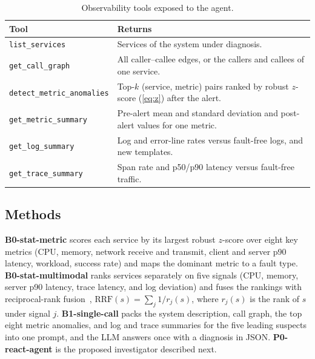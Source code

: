 \documentclass[conference]{IEEEtran}
\begin{document}
\begin{table}[t]
\centering
\caption{Observability tools exposed to the agent.}
\label{tab:tools}
\footnotesize
\begin{tabular}{@{}>{\raggedright\arraybackslash}p{2.75cm}>{\raggedright\arraybackslash}p{5.1cm}@{}}
\toprule
\textbf{Tool} & \textbf{Returns} \\
\midrule
\texttt{list\_services} & Services of the system under diagnosis. \\
\texttt{get\_call\_graph} & All caller--callee edges, or the callers and callees of one service. \\
\texttt{detect\_metric\_}\allowbreak\texttt{anomalies} & Top-$k$ (service, metric) pairs ranked by robust $z$-score (\ref{eq:z}) after the alert. \\
\texttt{get\_metric\_summary} & Pre-alert mean and standard deviation and post-alert values for one metric. \\
\texttt{get\_log\_summary} & Log and error-line rates versus fault-free logs, and new templates. \\
\texttt{get\_trace\_summary} & Span rate and p50/p90 latency versus fault-free traffic. \\
\bottomrule
\end{tabular}
\end{table}

\subsection{Methods}
\textbf{B0-stat-metric} scores each service by its largest robust $z$-score over eight key metrics (CPU, memory, network receive and transmit, client and server p90 latency, workload, success rate) and maps the dominant metric to a fault type. \textbf{B0-stat-multimodal} ranks services separately on five signals (CPU, memory, server p90 latency, trace latency, and log deviation) and fuses the rankings with reciprocal-rank fusion~\cite{cormack2009rrf}, $\text{RRF}(s)=\sum_{j}1/r_j(s)$, where $r_j(s)$ is the rank of $s$ under signal $j$. \textbf{B1-single-call} packs the system description, call graph, the top eight metric anomalies, and log and trace summaries for the five leading suspects into one prompt, and the LLM answers once with a diagnosis in JSON. \textbf{P0-react-agent} is the proposed investigator described next.
\end{document}
